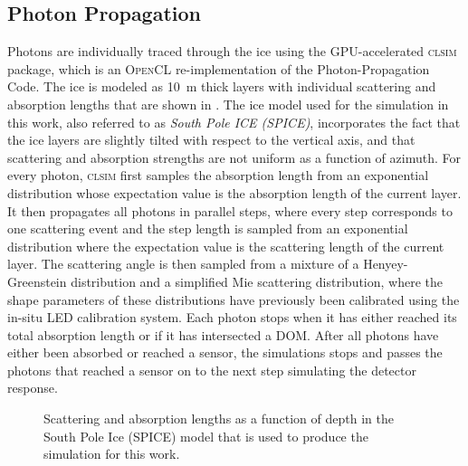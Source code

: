 \subsection{Photon Propagation}
\label{sec:photon-propagation}

Photons are individually traced through the ice using the GPU-accelerated \textsc{clsim}\cite{clsim} package, which is an \textsc{OpenCL} re-implementation of the Photon-Propagation Code.
 The ice is modeled as 10~m thick layers with individual scattering and absorption lengths that are shown in .
The ice model used for the simulation in this work, also referred to as \emph{South Pole ICE (SPICE)}, incorporates the fact that the ice layers are slightly tilted with respect to the vertical axis, and that scattering and absorption strengths are not uniform as a function of azimuth.
For every photon, \textsc{clsim} first samples the absorption length from an exponential distribution whose expectation value is the absorption length of the current layer.
It then propagates all photons in parallel steps, where every step corresponds to one scattering event and the step length is sampled from an exponential distribution where the expectation value is the scattering length of the current layer.
The scattering angle is then sampled from a mixture of a Henyey-Greenstein distribution and a simplified Mie scattering distribution, where the shape parameters of these distributions have previously been calibrated using the in-situ LED calibration system\cite{flasher_calibration}.
Each photon stops when it has either reached its total absorption length or if it has intersected a DOM.
After all photons have either been absorbed or reached a sensor, the simulations stops and passes the photons that reached a sensor on to the next step simulating the detector response.

\begin{figure}
    \centering
    
    \caption{Scattering and absorption lengths as a function of depth in the South Pole Ice (SPICE) model that is used to produce the simulation for this work.}
    \label{fig:spice-model}
\end{figure}


